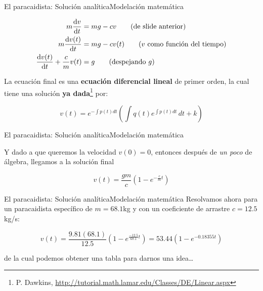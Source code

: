 \documentclass[spanish, c]{beamer}
\begin{document}
\begin{frame}{El paracaidista: Solución analítica}{Modelación matemática}

    \begin{align*}
        m\dv{v}{t} & = mg - cv \tag{de slide anterior} \\
        m\dv{v(t)}{t} & = mg - cv(t) \tag{$v$ como función del tiempo} \\
        \dv{v(t)}{t} + \frac{c}{m}v(t) & = g \tag{despejando $g$}
    \end{align*} \pause

    La ecuación final es una \textbf{ecuación diferencial lineal} de primer orden, la cual tiene una solución \textbf{ya dada}\footnote{P. Dawkins, \url{http://tutorial.math.lamar.edu/Classes/DE/Linear.aspx}} por:

    $$v(t) = e^{-\int p(t)dt} \left( \int q(t) e^{\int p(t)dt} \, dt + k\right)$$

\end{frame}

\begin{frame}{El paracaidista: Solución analítica}{Modelación matemática}

    Y dado a que queremos la velocidad $v(0) = 0$, entonces después de \textit{un poco} de álgebra, llegamos a la solución final

    \begin{equation}
        v(t) = \frac{gm}{c} \left(1 - e^{-\frac{c}{m}t}\right)
    \end{equation}

\end{frame}

\begin{frame}{El paracaidista: Solución analítica}{Modelación matemática}
    Resolvamos ahora para un paracaidista específico de $m = 68.1$kg y con un coeficiente de arrastre $c=12.5$kg/s:

    \bigskip

    $$v(t) = \frac{9.81(68.1)}{12.5} \left(1 - e^{\frac{-12.5}{68.1}t}\right) = 53.44(1 - e^{-0.18355t})$$

    \bigskip

    de la cual podemos obtener una tabla para darnos una idea\dots
\end{frame}
\end{document}
